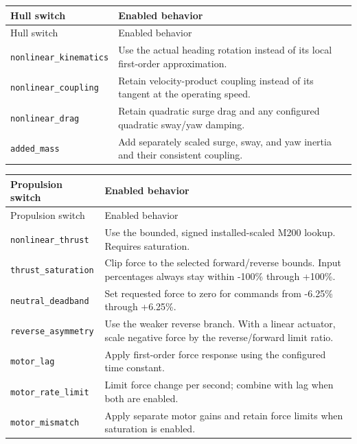 \documentclass[10pt,letterpaper]{article}
\begin{document}
{\footnotesize
\setlength{\tabcolsep}{5pt}
\renewcommand{\arraystretch}{1.18}
\begin{longtable}{@{}>{\raggedright\arraybackslash}p{}>{\raggedright\arraybackslash}p{}@{}}
\toprule
Hull switch & Enabled behavior \\
\midrule
\endfirsthead
\toprule
Hull switch & Enabled behavior \\
\midrule
\endhead
\bottomrule
\endfoot
\texttt{nonlinear\_kinematics} & Use the actual heading rotation instead of its local first-order approximation. \\
\addlinespace[3pt]
\texttt{nonlinear\_coupling} & Retain velocity-product coupling instead of its tangent at the operating speed. \\
\addlinespace[3pt]
\texttt{nonlinear\_drag} & Retain quadratic surge drag and any configured quadratic sway/yaw damping. \\
\addlinespace[3pt]
\texttt{added\_mass} & Add separately scaled surge, sway, and yaw inertia and their consistent coupling. \\
\end{longtable}
}



{\footnotesize
\setlength{\tabcolsep}{5pt}
\renewcommand{\arraystretch}{1.18}
\begin{longtable}{@{}>{\raggedright\arraybackslash}p{}>{\raggedright\arraybackslash}p{}@{}}
\toprule
Propulsion switch & Enabled behavior \\
\midrule
\endfirsthead
\toprule
Propulsion switch & Enabled behavior \\
\midrule
\endhead
\bottomrule
\endfoot
\texttt{nonlinear\_thrust} & Use the bounded, signed installed-scaled M200 lookup. Requires saturation. \\
\addlinespace[3pt]
\texttt{thrust\_saturation} & Clip force to the selected forward/reverse bounds. Input percentages always stay within -100\% through +100\%. \\
\addlinespace[3pt]
\texttt{neutral\_deadband} & Set requested force to zero for commands from -6.25\% through +6.25\%. \\
\addlinespace[3pt]
\texttt{reverse\_asymmetry} & Use the weaker reverse branch. With a linear actuator, scale negative force by the reverse/forward limit ratio. \\
\addlinespace[3pt]
\texttt{motor\_lag} & Apply first-order force response using the configured time constant. \\
\addlinespace[3pt]
\texttt{motor\_rate\_limit} & Limit force change per second; combine with lag when both are enabled. \\
\addlinespace[3pt]
\texttt{motor\_mismatch} & Apply separate motor gains and retain force limits when saturation is enabled. \\
\end{longtable}
}
\end{document}
